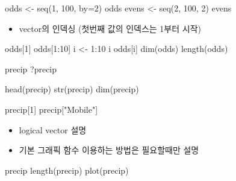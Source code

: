 \documentclass[
]{book}
\newenvironment{Shaded}{\begin{snugshade}}{\end{snugshade}}
\newcommand{\AttributeTok}[1]{\textcolor[rgb]{0.77,0.63,0.00}{#1}}
\newcommand{\DecValTok}[1]{\textcolor[rgb]{0.00,0.00,0.81}{#1}}
\newcommand{\FunctionTok}[1]{\textcolor[rgb]{0.00,0.00,0.00}{#1}}
\newcommand{\NormalTok}[1]{#1}
\newcommand{\OtherTok}[1]{\textcolor[rgb]{0.56,0.35,0.01}{#1}}
\newcommand{\SpecialCharTok}[1]{\textcolor[rgb]{0.00,0.00,0.00}{#1}}
\newcommand{\StringTok}[1]{\textcolor[rgb]{0.31,0.60,0.02}{#1}}
\providecommand{\tightlist}{%
  \setlength{\itemsep}{0pt}\setlength{\parskip}{0pt}}
\begin{document}
\begin{Shaded}
\begin{Highlighting}[]
\NormalTok{odds }\OtherTok{\textless{}{-}} \FunctionTok{seq}\NormalTok{(}\DecValTok{1}\NormalTok{, }\DecValTok{100}\NormalTok{, }\AttributeTok{by=}\DecValTok{2}\NormalTok{)}
\NormalTok{odds  }
\NormalTok{evens }\OtherTok{\textless{}{-}} \FunctionTok{seq}\NormalTok{(}\DecValTok{2}\NormalTok{, }\DecValTok{100}\NormalTok{, }\DecValTok{2}\NormalTok{)}
\NormalTok{evens}
\end{Highlighting}
\end{Shaded}

\begin{itemize}
\tightlist
\item
  vector의 인덱싱 (첫번째 값의 인덱스는 1부터 시작)
\end{itemize}

\begin{Shaded}
\begin{Highlighting}[]

\NormalTok{odds[}\DecValTok{1}\NormalTok{]}
\NormalTok{odds[}\DecValTok{1}\SpecialCharTok{:}\DecValTok{10}\NormalTok{]}
\NormalTok{i }\OtherTok{\textless{}{-}} \DecValTok{1}\SpecialCharTok{:}\DecValTok{10}
\NormalTok{i}
\NormalTok{odds[i]}
\FunctionTok{dim}\NormalTok{(odds)}
\FunctionTok{length}\NormalTok{(odds)}
\end{Highlighting}
\end{Shaded}

\begin{Shaded}
\begin{Highlighting}[]
\NormalTok{precip}
\NormalTok{?precip}

\FunctionTok{head}\NormalTok{(precip)}
\FunctionTok{str}\NormalTok{(precip)}
\FunctionTok{dim}\NormalTok{(precip)}

\NormalTok{precip[}\DecValTok{1}\NormalTok{]}
\NormalTok{precip[}\StringTok{"Mobile"}\NormalTok{]}
\end{Highlighting}
\end{Shaded}

\begin{itemize}
\tightlist
\item
  logical vector 설명
\item
  기본 그래픽 함수 이용하는 방법은 필요할때만 설명
\end{itemize}

\begin{Shaded}
\begin{Highlighting}[]
\NormalTok{precip}
\FunctionTok{length}\NormalTok{(precip)}
\FunctionTok{plot}\NormalTok{(precip)}
\end{Highlighting}
\end{Shaded}
\end{document}
